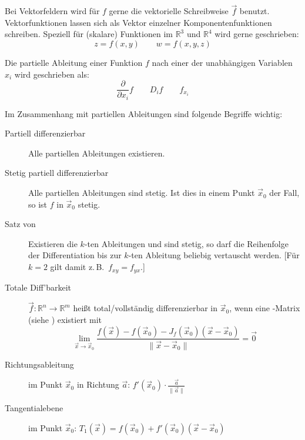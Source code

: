 Bei Vektorfeldern wird für $f$ gerne die vektorielle Schreibweise $\vec f$ benutzt.
Vektorfunktionen lassen sich als Vektor einzelner Komponentenfunktionen schreiben.
Speziell für (skalare) Funktionen im $\mathbb{R}^3$ und $\mathbb{R}^4$ wird gerne geschrieben:
\[
    z = f(x,y) \qquad w = f(x,y,z)
\]

Die partielle Ableitung einer Funktion $f$ nach einer der unabhängigen Variablen $x_i$ wird geschrieben als:
\[
    \frac{\partial}{\partial x_i}f \qquad D_i f \qquad f_{x_i}
\]

Im Zusammenhang mit partiellen Ableitungen sind folgende Begriffe wichtig:
\begin{description}
  \item[Partiell differenzierbar]
    Alle partiellen Ableitungen existieren.
  \item[Stetig partiell differenzierbar]
    Alle partiellen Ableitungen sind stetig.
    Ist dies in einem Punkt $\vec x_0$ der Fall, so ist $f$ in $\vec x_0$ stetig.
  \item[Satz von ] \label{satz-von-schwarz}
    Existieren die $k$-ten Ableitungen und sind stetig, so darf die Reihenfolge der Differentiation bis zur $k$-ten Ableitung beliebig vertauscht werden.
    [Für $k=2$ gilt damit z.\,B.~$f_{xy}=f_{yx}$.]
  \item[Totale Diff'barkeit]
    $\vec f : \mathbb{R}^n \to \mathbb{R}^m$ heißt total/vollständig differenzierbar in $\vec x_0$, wenn eine -Matrix (siehe ) existiert mit
    \[ \lim_{\vec x \to \vec x_0} \frac{f(\vec x) - f(\vec x_0) - J_f(\vec x_0)(\vec x-\vec x_0)}{\lVert\vec x-\vec x_0\rVert} = \vec 0 \]
  \item[Richtungsableitung] 
    im Punkt $\vec x_0$ in Richtung $\vec a$: $f'(\vec x_0) \cdot \frac{\vec a}{\lVert\vec a\rVert}$
  \item[Tangentialebene]
    im Punkt $\vec x_0$: $T_1(\vec x) = f(\vec x_0) + f'(\vec x_0)(\vec x - \vec x_0)$
        
\end{description}


